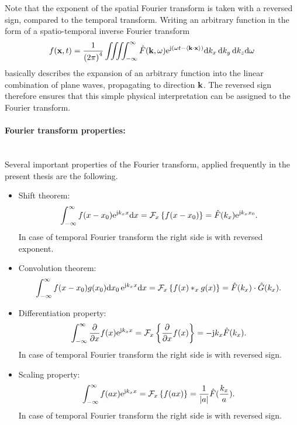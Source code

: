 Note that the exponent of the spatial Fourier transform is taken with a reversed sign, compared to the temporal transform.
Writing an arbitrary function in the form of a spatio-temporal inverse Fourier transform
\begin{equation}
f(\mathbf{x},t) = \frac{1}{\left( 2\pi \right)^4} \iiiint_{-\infty}^{\infty} \hat{F}(\mathbf{k},\omega) \mathrm{e}^{ \mathrm{j} \left( \omega t - \left< \mathbf{k} \cdot \mathbf{x} \right> \right)} \mathrm{d} k_x \, \mathrm{d} k_y \, \mathrm{d} k_z \mathrm{d} \omega
\end{equation}
basically describes the expansion of an arbitrary function into the linear combination of plane waves, propagating to direction $\mathbf{k}$.
The reversed sign therefore ensures that this simple physical interpretation can be assigned to the Fourier transform.

\paragraph{Fourier transform properties:}\mbox{} \\
Several important properties of the Fourier transform, applied frequently in the present thesis are the following.
\begin{itemize}
\item Shift theorem:
\begin{equation}
\int_{-\infty}^{\infty} f(x-x_0) \mathrm{e}^{\mathrm{j} k_x x} \mathrm{d} x = \mathcal{F}_x \left\{ f(x-x_0) \right\} = \hat{F}(k_x) \mathrm{e}^{\mathrm{j} k_x x_0}.
\end{equation}
In case of temporal Fourier transform the right side is with reversed exponent.
\item Convolution theorem:
\begin{equation}
\int_{-\infty}^{\infty} f(x-x_0) g(x_0) \mathrm{d} x_0 \, \mathrm{e}^{\mathrm{j} k_x x} \mathrm{d} x = \mathcal{F}_x \left\{ f(x) \ast_x g(x) \right\} = \hat{F}(k_x) \cdot \hat{G}(k_x).
\end{equation}
\item Differentiation property:
\begin{equation}
\int_{-\infty}^{\infty} \frac{\partial}{\partial x} f(x) \mathrm{e}^{\mathrm{j} k_x x} = \mathcal{F}_x \left\{ \frac{\partial}{\partial x} f(x) \right\} = 
-\mathrm{j} k_x \hat{F}(k_x).
\end{equation}
In case of temporal Fourier transform the right side is with reversed sign.
\item Scaling property:
\begin{equation}
\int_{-\infty}^{\infty} f(a x) \mathrm{e}^{\mathrm{j} k_x x} = \mathcal{F}_x \left\{ f( a x) \right\} = 
\frac{1}{|a|}\hat{F}(\frac{k_x}{a}).
\end{equation}
In case of temporal Fourier transform the right side is with reversed sign.
\end{itemize}

